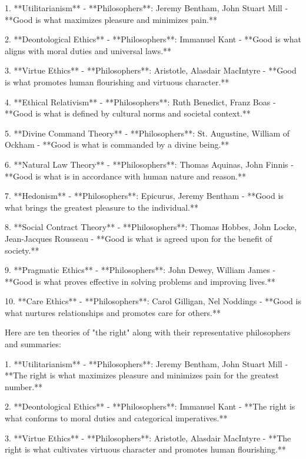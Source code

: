 1. **Utilitarianism**  
   - **Philosophers**: Jeremy Bentham, John Stuart Mill  
   - **Good is what maximizes pleasure and minimizes pain.**

2. **Deontological Ethics**  
   - **Philosophers**: Immanuel Kant  
   - **Good is what aligns with moral duties and universal laws.**

3. **Virtue Ethics**  
   - **Philosophers**: Aristotle, Alasdair MacIntyre  
   - **Good is what promotes human flourishing and virtuous character.**

4. **Ethical Relativism**  
   - **Philosophers**: Ruth Benedict, Franz Boas  
   - **Good is what is defined by cultural norms and societal context.**

5. **Divine Command Theory**  
   - **Philosophers**: St. Augustine, William of Ockham  
   - **Good is what is commanded by a divine being.**

6. **Natural Law Theory**  
   - **Philosophers**: Thomas Aquinas, John Finnis  
   - **Good is what is in accordance with human nature and reason.**

7. **Hedonism**  
   - **Philosophers**: Epicurus, Jeremy Bentham  
   - **Good is what brings the greatest pleasure to the individual.**

8. **Social Contract Theory**  
   - **Philosophers**: Thomas Hobbes, John Locke, Jean-Jacques Rousseau  
   - **Good is what is agreed upon for the benefit of society.**

9. **Pragmatic Ethics**  
   - **Philosophers**: John Dewey, William James  
   - **Good is what proves effective in solving problems and improving lives.**

10. **Care Ethics**  
    - **Philosophers**: Carol Gilligan, Nel Noddings  
    - **Good is what nurtures relationships and promotes care for others.**


Here are ten theories of "the right" along with their representative philosophers and summaries:

1. **Utilitarianism**  
   - **Philosophers**: Jeremy Bentham, John Stuart Mill  
   - **The right is what maximizes pleasure and minimizes pain for the greatest number.**

2. **Deontological Ethics**  
   - **Philosophers**: Immanuel Kant  
   - **The right is what conforms to moral duties and categorical imperatives.**

3. **Virtue Ethics**  
   - **Philosophers**: Aristotle, Alasdair MacIntyre  
   - **The right is what cultivates virtuous character and promotes human flourishing.**


